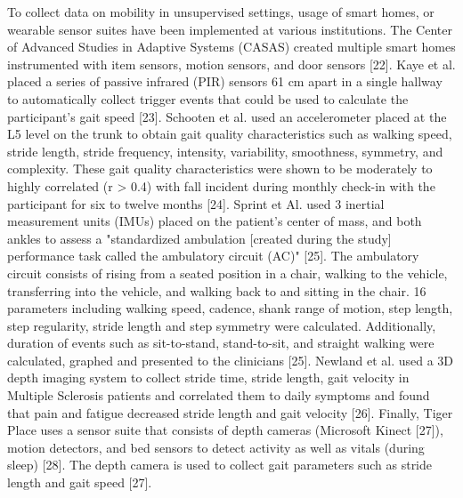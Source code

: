 To collect data on mobility in unsupervised settings, usage of smart homes, or wearable sensor suites 
have been implemented at various institutions. The Center of Advanced Studies in Adaptive Systems (CASAS) 
created multiple smart homes instrumented with item sensors, motion sensors, and door sensors [22]. 
Kaye et al. placed a series of passive infrared (PIR) sensors 61 cm apart in a single hallway to 
automatically collect trigger events that could be used to calculate the participant's gait speed [23]. 
Schooten et al. used an accelerometer placed at the L5 level on the trunk to obtain gait quality 
characteristics such as walking speed, stride length, stride frequency, intensity, variability, 
smoothness, symmetry, and complexity. These gait quality characteristics were shown to be moderately to 
highly correlated (r > 0.4) with fall incident during monthly check-in with the participant for six to 
twelve months [24]. Sprint et Al. used 3 inertial measurement units (IMUs) placed on the patient's center 
of mass, and both ankles to assess a "standardized ambulation [created during the study] performance task 
called the ambulatory circuit (AC)" [25]. The ambulatory circuit consists of rising from a seated position 
in a chair, walking to the vehicle, transferring into the vehicle, and walking back to and sitting in the 
chair. 16 parameters including walking speed, cadence, shank range of motion, step length, step regularity, 
stride length and step symmetry were calculated. Additionally, duration of events such as sit-to-stand, 
stand-to-sit, and straight walking were calculated, graphed and presented to the clinicians [25]. 
Newland et al. used a 3D depth imaging system to collect stride time, stride length, gait velocity in 
Multiple Sclerosis patients and correlated them to daily symptoms and found that pain and fatigue 
decreased stride length and gait velocity [26]. Finally, Tiger Place uses a sensor suite that consists 
of depth cameras (Microsoft Kinect [27]), motion detectors, and bed sensors to detect activity as well 
as vitals (during sleep) [28]. The depth camera is used to collect gait parameters such as stride length 
and gait speed [27].

